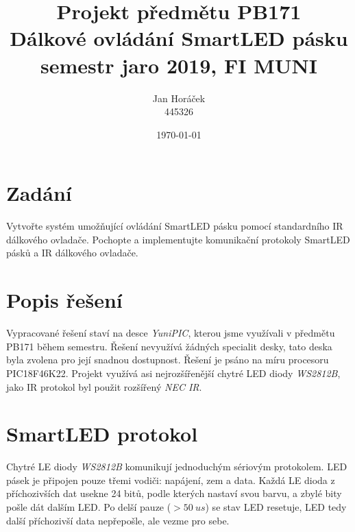 \documentclass[12pt,a4paper]{article}
\begin{document}
\setcounter{page}{1}  %

\title{\normalsize Projekt předmětu PB171 \\ \huge Dálkové ovládání SmartLED pásku
\\ \normalsize semestr jaro 2019, FI MUNI}
\author{Jan Horáček\\ 445326}
\date{\today}
\maketitle

\setlength{\parindent}{0cm}
\setlength{\parskip}{3mm plus2pt minus2pt}

\section{Zadání}

Vytvořte systém umožňující ovládání SmartLED pásku pomocí standardního IR
dálkového ovladače. Pochopte a implementujte komunikační protokoly SmartLED
pásků a IR dálkového ovladače.

\section{Popis řešení}

Vypracované řešení staví na desce \textit{YuniPIC}, kterou jsme využívali
v předmětu PB171 během semestru. Řešení nevyužívá žádných specialit desky,
tato deska byla zvolena pro její snadnou dostupnost. Řešení je psáno na míru
procesoru PIC18F46K22. Projekt využívá asi nejrozšířenější chytré LED diody
\textit{WS2812B}, jako IR protokol byl použit rozšířený \textit{NEC IR}.

\section{SmartLED protokol}

Chytré LE diody \textit{WS2812B} komunikují jednoduchým sériovým protokolem.
LED pásek je připojen pouze třemi vodiči: napájení, zem a data. Každá LE dioda
z příchozivších dat usekne 24 bitů, podle kterých nastaví svou barvu, a zbylé
bity pošle dát dalším LED. Po delší pauze ($> 50\ us$) se stav LED resetuje,
LED tedy další příchozivší data nepřepošle, ale vezme pro sebe.
\end{document}
